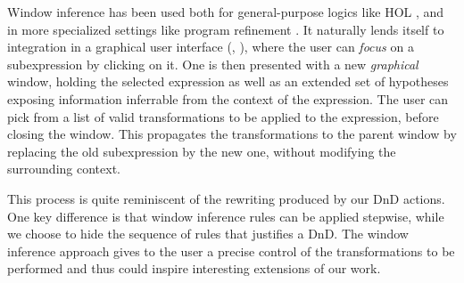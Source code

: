 Window inference has been used both for general-purpose logics like
HOL \cite{grundy-window-1991}, and in more specialized settings like
program refinement \cite{grundy-window-1992}. It naturally lends
itself to integration in a graphical user interface
(\cite{langbacka-tkwinhol-1995}, \cite{goos-tas-2000}), where the user
can \emph{focus} on a subexpression by clicking on it. One is then
presented with a new \emph{graphical} window, holding the selected
expression as well as an extended set of hypotheses exposing
information inferrable from the context of the expression. The user
can pick from a list of valid transformations to be applied to the
expression, before closing the window. This propagates the
transformations to the parent window by replacing the old
subexpression by the new one, without modifying the surrounding
context.

This process is quite reminiscent of the rewriting produced by our DnD
actions.  One key difference is that window inference rules can be
applied stepwise, while we choose to hide the sequence of rules that
justifies a DnD. The window inference approach gives to the user a
precise control of the transformations to be performed and thus could
inspire interesting extensions of our work.


